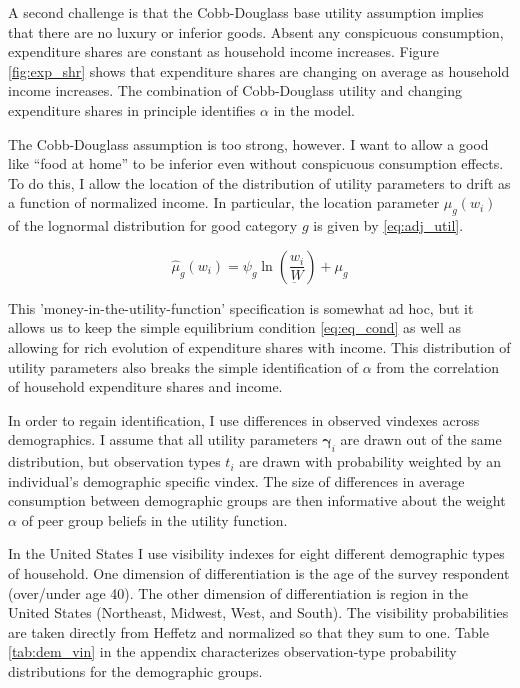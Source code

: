 \documentclass[12pt]{article}
\begin{document}
A second challenge is that the Cobb-Douglass base utility assumption implies that there are no luxury or inferior goods.  Absent any conspicuous consumption, expenditure shares are constant as household  income increases.  Figure \ref{fig:exp_shr} shows that expenditure shares are changing on average as household income increases.  The combination of Cobb-Douglass utility and changing expenditure shares in principle identifies $\alpha$ in the model.

The Cobb-Douglass assumption is too strong, however.  I want to allow a good like ``food at home'' to be inferior even without conspicuous consumption effects.  To do this, I allow the location of the distribution of utility parameters to drift as a function of normalized income.  In particular, the location parameter $\hat{\mu}_g(w_i)$ of the lognormal distribution for good category $g$ is given by \eqref{eq:adj_util}.

\begin{equation}
    \label{eq:adj_util}
    \hat{\mu}_g(w_i) = \psi_g \ln \left(\frac{w_i}{\underbar{W}}\right) + \mu_g
\end{equation}

This 'money-in-the-utility-function' specification is somewhat ad hoc, but it allows us to keep the simple equilibrium condition \eqref{eq:eq_cond} as well as allowing for rich evolution of expenditure shares with income.  This distribution of utility parameters also breaks the simple identification of $\alpha$ from the correlation of household expenditure shares and income.

In order to regain identification, I use differences in observed vindexes across demographics.  I assume that all utility parameters $\boldsymbol{\gamma}_i$ are drawn out of the same distribution, but observation types $t_i$ are drawn with probability weighted by an individual's demographic specific vindex.  The size of differences in average consumption between demographic groups are then informative about the weight $\alpha$ of peer group beliefs in the utility function.

In the United States I use visibility indexes for eight different demographic types of household.  One dimension of differentiation is the age of the survey respondent (over/under age 40). The other dimension of differentiation is region in the United States (Northeast, Midwest, West, and South).  The visibility probabilities are taken directly from Heffetz and normalized so that they sum to one.  Table \ref{tab:dem_vin} in the appendix characterizes observation-type probability distributions for the demographic groups.
\end{document}
